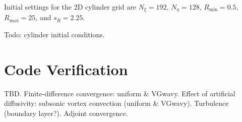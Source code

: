\documentclass[letterpaper,10pt]{article}
\begin{document}
Initial settings for the 2D cylinder grid are $N_\xi=192$, $N_\eta=128$, $R_\mathrm{min}=0.5$, $R_\mathrm{max}=25$, and $s_R=2.25$.

Todo: cylinder initial conditions.



\clearpage
\section{Code Verification} \label{sec:verification}

TBD. Finite-difference convergence: uniform \& VGwavy. Effect of artificial diffusivity: subsonic vortex convection (uniform \& VGwavy). Turbulence (boundary layer?). Adjoint convergence.





\end{document}
